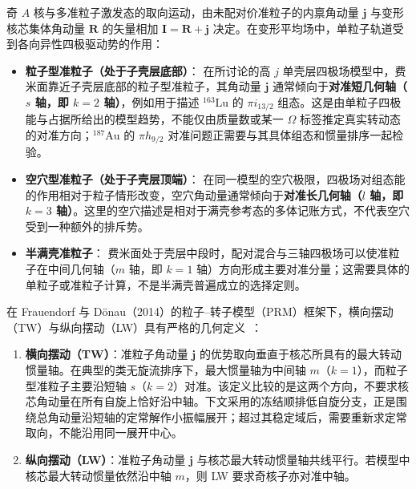奇 $A$ 核与多准粒子激发态的取向运动，由未配对价准粒子的内禀角动量 $\mathbf{j}$ 与变形核芯集体角动量 $\mathbf{R}$ 的矢量相加 $\mathbf{I} = \mathbf{R} + \mathbf{j}$ 决定。在变形平均场中，单粒子轨道受到各向异性四极驱动势的作用：
\begin{itemize}
\item \textbf{粒子型准粒子（处于子壳层底部）}：
在所讨论的高 $j$ 单壳层四极场模型中，费米面靠近子壳层底部的粒子型准粒子，其角动量 $\mathbf{j}$ 通常倾向于\textbf{对准短几何轴（$s$ 轴，即 $k=2$ 轴）}，例如用于描述 $^{163}\mathrm{Lu}$ 的 $\pi i_{13/2}$ 组态。这是由单粒子四极能与占据所给出的模型趋势，不能仅由质量数或某一 $\Omega$ 标签推定真实转动态的对准方向；$^{187}\mathrm{Au}$ 的 $\pi h_{9/2}$ 对准问题正需要与其具体组态和惯量排序一起检验。
\item \textbf{空穴型准粒子（处于子壳层顶端）}：
在同一模型的空穴极限，四极场对组态能的作用相对于粒子情形改变，空穴角动量通常倾向于\textbf{对准长几何轴（$l$ 轴，即 $k=3$ 轴）}。这里的空穴描述是相对于满壳参考态的多体记账方式，不代表空穴受到一种额外的排斥势。
\item \textbf{半满壳准粒子}：
费米面处于壳层中段时，配对混合与三轴四极场可以使准粒子在中间几何轴（$m$ 轴，即 $k=1$ 轴）方向形成主要对准分量；这需要具体的单粒子或准粒子计算，不是半满壳普遍成立的选择定则。
\end{itemize}

在 Frauendorf 与 Dönau（2014）的粒子--转子模型（PRM）框架下，横向摆动（TW）与纵向摆动（LW）具有严格的几何定义~\cite{frauendorf-2014-transverse-wobbling}：
\begin{enumerate}
\item \textbf{横向摆动（TW）}：准粒子角动量 $\mathbf{j}$ 的优势取向垂直于核芯所具有的最大转动惯量轴。在典型的类无旋流排序下，最大惯量轴为中间轴 $m$（$k=1$），而粒子型准粒子主要沿短轴 $s$（$k=2$）对准。该定义比较的是这两个方向，不要求核芯角动量在所有自旋上恰好沿中轴。下文采用的冻结顺排低自旋分支，正是围绕总角动量沿短轴的定常解作小振幅展开；超过其稳定域后，需要重新求定常取向，不能沿用同一展开中心。
\item \textbf{纵向摆动（LW）}：准粒子角动量 $\mathbf{j}$ 与核芯最大转动惯量轴共线平行。若模型中核芯最大转动惯量依然沿中轴 $m$，则 LW 要求奇核子亦对准中轴。
\end{enumerate}

